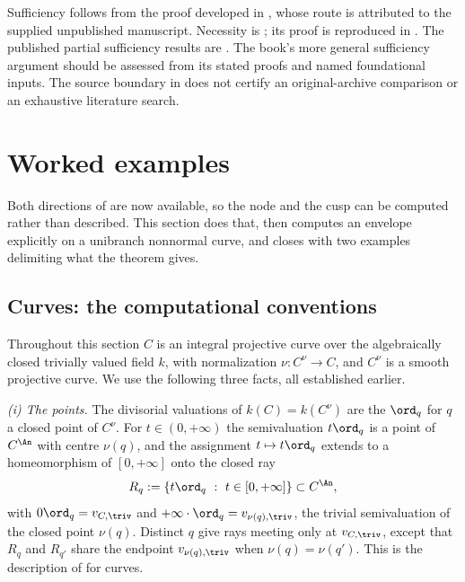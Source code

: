 \begin{remark}
\label{rem:ch45-two-provenances}
Sufficiency follows from the proof developed in
,
whose route is attributed to the supplied unpublished manuscript.
Necessity is \cite[Theorem~5.12]{BJ22}; its proof is reproduced in
.  The published partial sufficiency
results are .
The book's more general sufficiency argument should be assessed from its
stated proofs and named foundational inputs.  The source boundary in
 does not certify an original-archive comparison or
an exhaustive literature search.
\end{remark}

\section{Worked examples}
\label{sec:ch45-examples}

Both directions of  are now
available, so the node and the cusp can be computed rather than described.
This section does that, then computes an envelope explicitly on a unibranch
nonnormal curve, and closes with two examples delimiting what the theorem
gives.

\subsection{Curves: the computational conventions}
\label{sec:ch45-curve-conventions}

Throughout this section $C$ is an integral projective curve over the
algebraically closed trivially valued field $k$, with normalization
$\nu:C^\nu\to C$, and $C^\nu$ is a smooth projective curve.  We use the
following three facts, all established earlier.

\emph{(i) The points.}  The divisorial valuations of $k(C)=k(C^\nu)$ are
the $\ord_q$ for $q$ a closed point of $C^\nu$.  For $t\in(0,+\infty)$
the semivaluation $t\ord_q$ is a point of $C^{\An}$ with centre
$\nu(q)$, and the assignment $t\mapsto t\ord_q$ extends to a
homeomorphism of $[0,+\infty]$ onto the closed ray
\[
 R_q:=\{t\ord_q\ :\ t\in[0,+\infty]\}\subset C^{\An},
\]
with $0\ord_q=v_{C,\triv}$ and $+\infty\cdot\ord_q=v_{\nu(q),\triv}$, the
trivial semivaluation of the closed point $\nu(q)$.  Distinct $q$ give
rays meeting only at $v_{C,\triv}$, except that $R_q$ and $R_{q'}$
share the endpoint $v_{\nu(q),\triv}$ when $\nu(q)=\nu(q')$.  This is
the description of  for curves.

